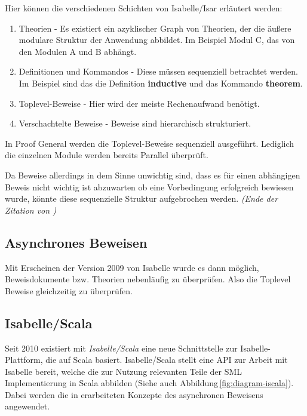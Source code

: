 Hier können die verschiedenen Schichten von Isabelle/Isar erläutert werden:

\begin{enumerate}
  \item Theorien - Es existiert ein azyklischer Graph von Theorien, der die äußere modulare Struktur
  der Anwendung abbildet. Im Beispiel Modul C, das von den Modulen A und B abhängt. 

  \item Definitionen und Kommandos -   Diese müssen sequenziell betrachtet werden. Im Beispiel sind
  das die Definition   \textbf{inductive} und das Kommando \textbf{theorem}.

  \item Toplevel-Beweise - Hier wird der meiste Rechenaufwand benötigt.

  \item Verschachtelte Beweise - Beweise sind hierarchisch strukturiert. 
\end{enumerate}

In Proof General werden die Toplevel-Beweise sequenziell ausgeführt. Lediglich die einzelnen Module
werden bereits Parallel überprüft.

Da Beweise allerdings in dem Sinne unwichtig sind, dass es für einen abhängigen Beweis nicht wichtig
ist abzuwarten ob eine Vorbedingung erfolgreich bewiesen wurde, könnte diese sequenzielle Struktur
aufgebrochen werden. \textit{(Ende der Zitation von \cite{parproof})}

\subsection{Asynchrones Beweisen}

Mit Erscheinen der Version 2009 von Isabelle wurde es dann möglich, Beweisdokumente bzw. Theorien
nebenläufig zu überprüfen. Also die Toplevel Beweise gleichzeitig zu überprüfen. \cite{parproof}

\subsection{Isabelle/Scala}

Seit 2010 existiert mit \textit{Isabelle/Scala} eine neue Schnittstelle zur Isabelle-Plattform, die
auf Scala basiert. Isabelle/Scala stellt eine API zur Arbeit mit Isabelle bereit, welche die zur
Nutzung relevanten Teile der SML Implementierung in Scala abbilden \cite{iscala} (Siehe auch
Abbildung\,\ref{fig:diagram-iscala}). Dabei werden die in \cite{parproof} erarbeiteten Konzepte des
asynchronen Beweisens angewendet.

